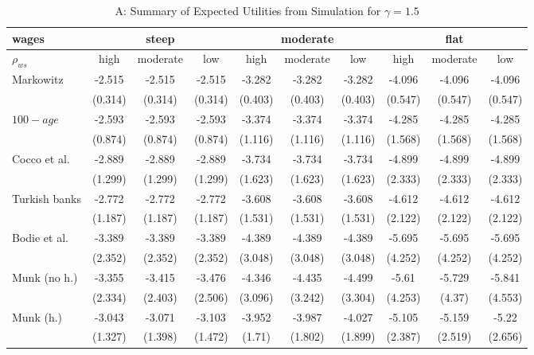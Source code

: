 \begin{table}[h!]
	\centering
	\caption{A: Summary of Expected Utilities from Simulation for $\gamma=1.5$}
	\label{table:util}
	\begin{tabular}[c]{|l|ccc|ccc|ccc|}
		\hline
		 wages& \multicolumn{3}{c|}{steep} & \multicolumn{3}{c|}{moderate} & \multicolumn{3}{c|}{flat}\\
		\hline
		$\rho_{ws}$&high&moderate&low&high&moderate&low&high&moderate&low\\
		\hline
Markowitz					&-2.515&-2.515&-2.515&-3.282&-3.282&-3.282&-4.096&-4.096&-4.096\\
							&(0.314)&(0.314)&(0.314)&(0.403)&(0.403)&(0.403)&(0.547)&(0.547)&(0.547)\\
$100-age$					&-2.593&-2.593&-2.593&-3.374&-3.374&-3.374&-4.285&-4.285&-4.285\\
							&(0.874)&(0.874)&(0.874)&(1.116)&(1.116)&(1.116)&(1.568)&(1.568)&(1.568)\\
Cocco et al.				&-2.889&-2.889&-2.889&-3.734&-3.734&-3.734&-4.899&-4.899&-4.899\\
							&(1.299)&(1.299)&(1.299)&(1.623)&(1.623)&(1.623)&(2.333)&(2.333)&(2.333)\\
Turkish banks			 	&-2.772&-2.772&-2.772&-3.608&-3.608&-3.608&-4.612&-4.612&-4.612\\
							&(1.187)&(1.187)&(1.187)&(1.531)&(1.531)&(1.531)&(2.122)&(2.122)&(2.122)\\
Bodie et al.			 	&-3.389&-3.389&-3.389&-4.389&-4.389&-4.389&-5.695&-5.695&-5.695\\
							&(2.352)&(2.352)&(2.352)&(3.048)&(3.048)&(3.048)&(4.252)&(4.252)&(4.252)\\
Munk (no h.)				&-3.355&-3.415&-3.476&-4.346&-4.435&-4.499&-5.61&-5.729&-5.841\\
							&(2.334)&(2.403)&(2.506)&(3.096)&(3.242)&(3.304)&(4.253)&(4.37)&(4.553)\\
Munk (h.)					&-3.043&-3.071&-3.103&-3.952&-3.987&-4.027&-5.105&-5.159&-5.22\\
							&(1.327)&(1.398)&(1.472)&(1.71)&(1.802)&(1.899)&(2.387)&(2.519)&(2.656)\\
	\hline
	\end{tabular}
\end{table}
